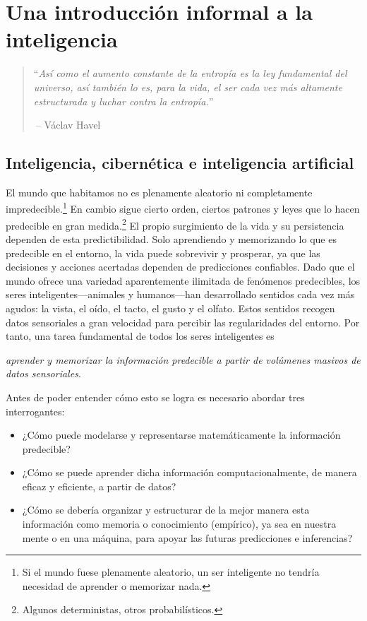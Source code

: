 \documentclass[../../book-main_es.tex]{subfiles}
\begin{document}
\chapter{Una introducción informal a la inteligencia}
\label{ch:intro}

\begin{quote}
    ``{\em Así como el aumento constante de la entropía es la ley fundamental
        del universo, así también lo es, para la vida, el ser cada vez más
    altamente estructurada y luchar contra la entropía.}''

    $~$\hfill -- V\'{a}clav Havel
\end{quote}
\vspace{5mm}

\section{Inteligencia, cibernética e inteligencia artificial}
El mundo que habitamos no es plenamente aleatorio ni completamente
impredecible.\footnote{Si el mundo fuese plenamente aleatorio, un
ser inteligente no tendría necesidad de aprender o memorizar nada.}
En cambio sigue cierto orden, ciertos patrones y leyes que lo hacen
predecible en gran medida.\footnote{Algunos deterministas, otros
probabilísticos.} El propio surgimiento de la vida y su persistencia
dependen de esta predictibilidad. Solo aprendiendo y memorizando lo
que es predecible en el entorno, la vida puede sobrevivir y prosperar,
ya que las decisiones y acciones acertadas dependen de predicciones confiables.
Dado que el mundo ofrece una variedad aparentemente ilimitada de fenómenos
predecibles, los seres inteligentes---animales y humanos---han desarrollado
sentidos cada vez más agudos: la vista, el oído, el tacto, el gusto y el olfato.
Estos sentidos recogen datos sensoriales a gran velocidad para percibir las
regularidades del entorno. Por tanto, una tarea fundamental de todos los 
seres inteligentes es
\begin{center}
    \textit{aprender y memorizar la información predecible a partir de volúmenes
    masivos de datos sensoriales}.
\end{center}
Antes de poder entender cómo esto se logra es necesario abordar tres interrogantes:
\begin{itemize}
    \item ¿Cómo puede modelarse y representarse matemáticamente la información predecible? 
    \item ¿Cómo se puede aprender dicha información computacionalmente, de manera eficaz y eficiente, a partir de datos?
    \item ¿Cómo se debería organizar y estructurar de la mejor manera esta información
        como memoria o conocimiento (empírico), ya sea en nuestra mente o en una máquina,
        para apoyar las futuras predicciones e inferencias?
\end{itemize}
\end{document}
